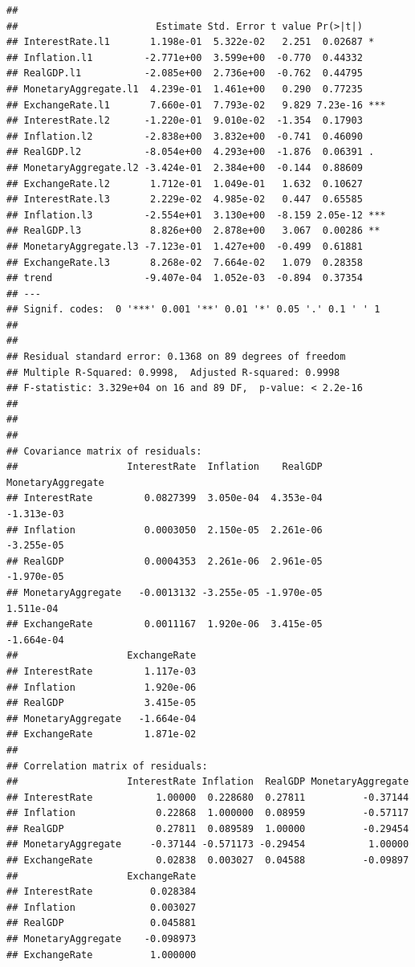\documentclass[11pt,preprint, authoryear]{elsarticle}
\numberwithin{equation}{section}
\numberwithin{figure}{section}
\numberwithin{table}{section}
\begin{document}
\begin{verbatim}
## 
##                        Estimate Std. Error t value Pr(>|t|)    
## InterestRate.l1       1.198e-01  5.322e-02   2.251  0.02687 *  
## Inflation.l1         -2.771e+00  3.599e+00  -0.770  0.44332    
## RealGDP.l1           -2.085e+00  2.736e+00  -0.762  0.44795    
## MonetaryAggregate.l1  4.239e-01  1.461e+00   0.290  0.77235    
## ExchangeRate.l1       7.660e-01  7.793e-02   9.829 7.23e-16 ***
## InterestRate.l2      -1.220e-01  9.010e-02  -1.354  0.17903    
## Inflation.l2         -2.838e+00  3.832e+00  -0.741  0.46090    
## RealGDP.l2           -8.054e+00  4.293e+00  -1.876  0.06391 .  
## MonetaryAggregate.l2 -3.424e-01  2.384e+00  -0.144  0.88609    
## ExchangeRate.l2       1.712e-01  1.049e-01   1.632  0.10627    
## InterestRate.l3       2.229e-02  4.985e-02   0.447  0.65585    
## Inflation.l3         -2.554e+01  3.130e+00  -8.159 2.05e-12 ***
## RealGDP.l3            8.826e+00  2.878e+00   3.067  0.00286 ** 
## MonetaryAggregate.l3 -7.123e-01  1.427e+00  -0.499  0.61881    
## ExchangeRate.l3       8.268e-02  7.664e-02   1.079  0.28358    
## trend                -9.407e-04  1.052e-03  -0.894  0.37354    
## ---
## Signif. codes:  0 '***' 0.001 '**' 0.01 '*' 0.05 '.' 0.1 ' ' 1
## 
## 
## Residual standard error: 0.1368 on 89 degrees of freedom
## Multiple R-Squared: 0.9998,  Adjusted R-squared: 0.9998 
## F-statistic: 3.329e+04 on 16 and 89 DF,  p-value: < 2.2e-16 
## 
## 
## 
## Covariance matrix of residuals:
##                   InterestRate  Inflation    RealGDP MonetaryAggregate
## InterestRate         0.0827399  3.050e-04  4.353e-04        -1.313e-03
## Inflation            0.0003050  2.150e-05  2.261e-06        -3.255e-05
## RealGDP              0.0004353  2.261e-06  2.961e-05        -1.970e-05
## MonetaryAggregate   -0.0013132 -3.255e-05 -1.970e-05         1.511e-04
## ExchangeRate         0.0011167  1.920e-06  3.415e-05        -1.664e-04
##                   ExchangeRate
## InterestRate         1.117e-03
## Inflation            1.920e-06
## RealGDP              3.415e-05
## MonetaryAggregate   -1.664e-04
## ExchangeRate         1.871e-02
## 
## Correlation matrix of residuals:
##                   InterestRate Inflation  RealGDP MonetaryAggregate
## InterestRate           1.00000  0.228680  0.27811          -0.37144
## Inflation              0.22868  1.000000  0.08959          -0.57117
## RealGDP                0.27811  0.089589  1.00000          -0.29454
## MonetaryAggregate     -0.37144 -0.571173 -0.29454           1.00000
## ExchangeRate           0.02838  0.003027  0.04588          -0.09897
##                   ExchangeRate
## InterestRate          0.028384
## Inflation             0.003027
## RealGDP               0.045881
## MonetaryAggregate    -0.098973
## ExchangeRate          1.000000
\end{verbatim}
\end{document}

